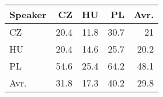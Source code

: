 \begin{tabular}{l|rrr|r}
\hline
 Speaker   &   CZ &   HU &   PL &   Avr. \\
\hline
 CZ        & 20.4 & 11.8 & 30.7 &   21   \\
 HU        & 20.4 & 14.6 & 25.7 &   20.2 \\
 PL        & 54.6 & 25.4 & 64.2 &   48.1 \\
\hline
 Avr.      & 31.8 & 17.3 & 40.2 &   29.8 \\
\hline
\end{tabular}
